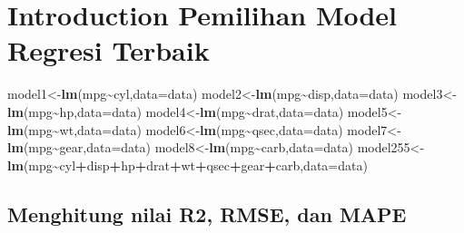 \documentclass[
]{article}
\newenvironment{Shaded}{\begin{snugshade}}{\end{snugshade}}
\newcommand{\AttributeTok}[1]{\textcolor[rgb]{0.13,0.29,0.53}{#1}}
\newcommand{\FunctionTok}[1]{\textcolor[rgb]{0.13,0.29,0.53}{\textbf{#1}}}
\newcommand{\NormalTok}[1]{#1}
\newcommand{\OtherTok}[1]{\textcolor[rgb]{0.56,0.35,0.01}{#1}}
\newcommand{\SpecialCharTok}[1]{\textcolor[rgb]{0.81,0.36,0.00}{\textbf{#1}}}
\begin{document}
\section{Introduction Pemilihan Model Regresi
Terbaik}\label{introduction-pemilihan-model-regresi-terbaik}

\begin{Shaded}
\begin{Highlighting}[]
\NormalTok{model1}\OtherTok{\textless{}{-}}\FunctionTok{lm}\NormalTok{(mpg}\SpecialCharTok{\textasciitilde{}}\NormalTok{cyl,}\AttributeTok{data=}\NormalTok{data) }
\NormalTok{model2}\OtherTok{\textless{}{-}}\FunctionTok{lm}\NormalTok{(mpg}\SpecialCharTok{\textasciitilde{}}\NormalTok{disp,}\AttributeTok{data=}\NormalTok{data) }
\NormalTok{model3}\OtherTok{\textless{}{-}}\FunctionTok{lm}\NormalTok{(mpg}\SpecialCharTok{\textasciitilde{}}\NormalTok{hp,}\AttributeTok{data=}\NormalTok{data) }
\NormalTok{model4}\OtherTok{\textless{}{-}}\FunctionTok{lm}\NormalTok{(mpg}\SpecialCharTok{\textasciitilde{}}\NormalTok{drat,}\AttributeTok{data=}\NormalTok{data) }
\NormalTok{model5}\OtherTok{\textless{}{-}}\FunctionTok{lm}\NormalTok{(mpg}\SpecialCharTok{\textasciitilde{}}\NormalTok{wt,}\AttributeTok{data=}\NormalTok{data) }
\NormalTok{model6}\OtherTok{\textless{}{-}}\FunctionTok{lm}\NormalTok{(mpg}\SpecialCharTok{\textasciitilde{}}\NormalTok{qsec,}\AttributeTok{data=}\NormalTok{data) }
\NormalTok{model7}\OtherTok{\textless{}{-}}\FunctionTok{lm}\NormalTok{(mpg}\SpecialCharTok{\textasciitilde{}}\NormalTok{gear,}\AttributeTok{data=}\NormalTok{data) }
\NormalTok{model8}\OtherTok{\textless{}{-}}\FunctionTok{lm}\NormalTok{(mpg}\SpecialCharTok{\textasciitilde{}}\NormalTok{carb,}\AttributeTok{data=}\NormalTok{data) }
\NormalTok{model255}\OtherTok{\textless{}{-}}\FunctionTok{lm}\NormalTok{(mpg}\SpecialCharTok{\textasciitilde{}}\NormalTok{cyl}\SpecialCharTok{+}\NormalTok{disp}\SpecialCharTok{+}\NormalTok{hp}\SpecialCharTok{+}\NormalTok{drat}\SpecialCharTok{+}\NormalTok{wt}\SpecialCharTok{+}\NormalTok{qsec}\SpecialCharTok{+}\NormalTok{gear}\SpecialCharTok{+}\NormalTok{carb,}\AttributeTok{data=}\NormalTok{data) }
\end{Highlighting}
\end{Shaded}

\subsection{Menghitung nilai R2, RMSE, dan
MAPE}\label{menghitung-nilai-r2-rmse-dan-mape}
\end{document}

